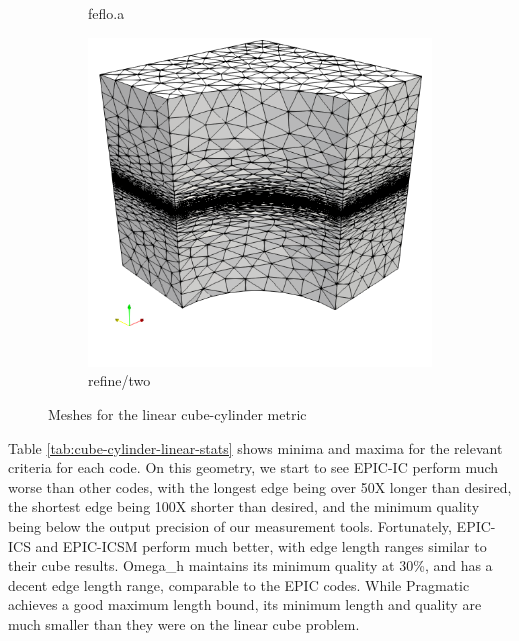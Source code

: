 \documentclass[3p,times,procedia,number]{elsarticle}
\begin{document}
\begin{figure}
\begin{subfigure}{.24\textwidth}
\caption{feflo.a}
\end{subfigure}
\begin{subfigure}{.24\textwidth}
\centering
\includegraphics[width=\textwidth]{refine-two-cube-cylinder-linear.png}
\caption{refine/two}
\end{subfigure}
\caption{Meshes for the linear cube-cylinder metric}
\label{fig:cube-cylinder-linear-meshes}
\end{figure}
Table \ref{tab:cube-cylinder-linear-stats} shows minima
and maxima for the relevant criteria for each code.
On this geometry, we start to see EPIC-IC perform much
worse than other codes, with the longest edge being over
50X longer than desired, the shortest edge being
100X shorter than desired, and the minimum quality being
below the output precision of our measurement tools.
Fortunately, EPIC-ICS and EPIC-ICSM perform much better,
with edge length ranges similar to their cube results.
Omega\_h maintains its minimum quality at 30\%, and
has a decent edge length range, comparable to the EPIC codes.
While Pragmatic achieves a good maximum length bound,
its minimum length and quality are much smaller than they
were on the linear cube problem.
\end{document}

